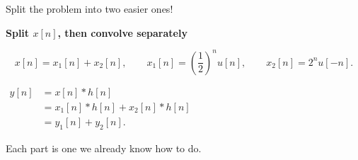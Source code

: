 \documentclass[aspectratio=169,11pt]{beamer}
\newcommand{\CardTitleSize}{\large}
\newcommand{\CardTitle}[1]{%
  \vspace{0.15cm}
  {\CardTitleSize\bfseries #1}\par
}
\begin{document}
\begin{frame}{Split the problem into two easier ones!}

\begin{center}
\begin{GreenCard}[
  width=\textwidth,
  halign=center,
  top=12pt,
  bottom=12pt
]
\CardTitle{Split \(x[n]\), then convolve separately}

\vspace{0.08cm}

\[
x[n]=x_1[n]+x_2[n],
\qquad
x_1[n]=\left(\frac12\right)^n u[n],
\qquad
x_2[n]=2^n u[-n].
\]

\vspace{0.12cm}

\(
\begin{aligned}
y[n]
&=x[n]*h[n]\\[3pt]
&=x_1[n]*h[n]+x_2[n]*h[n]\\[3pt]
&=y_1[n]+y_2[n].
\end{aligned}
\)

\vspace{0.08cm}

\begin{OrangeBox}[
  calloutshadedorange,
  halign=center,
  fontupper=\large
]{}
Each part is one we already know how to do.
\end{OrangeBox}

\end{GreenCard}
\end{center}

\end{frame}
\end{document}
